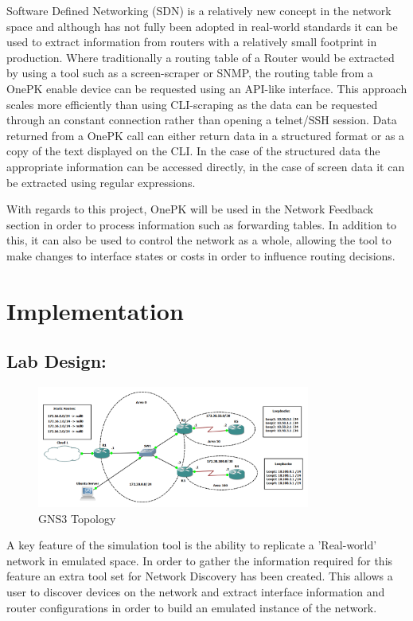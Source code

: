 \documentclass[11pt]{report}
\begin{document}
Software Defined Networking (SDN) is a relatively new concept in the network space and although has not fully been adopted in real-world standards it can be used to extract information from routers with a relatively small footprint in production. Where traditionally a routing table of a Router would be extracted by using a tool such as a screen-scraper or SNMP, the routing table from a OnePK enable device can be requested using an API-like interface. This approach scales more efficiently than using CLI-scraping as the data can be requested through an constant connection rather than opening a telnet/SSH session. Data returned from a OnePK call can either return data in a structured format or as a copy of the text displayed on the CLI. In the case of the structured data the appropriate information can be accessed directly, in the case of screen data it can be extracted using regular expressions.

With regards to this project, OnePK will be used in the Network Feedback section in order to process information such as forwarding tables. In addition to this, it can also be used to control the network as a whole, allowing the tool to make changes to interface states or costs in order to influence routing decisions.

\chapter{Implementation}

\section{Lab Design:}

\begin{figure}[h!]
\caption{GNS3 Topology}
\centering
\includegraphics[width=0.8\textwidth]{Lab-Design.png}
\end{figure}

A key feature of the simulation tool is the ability to replicate a 'Real-world' network in emulated space. In order to gather the information required for this feature an extra tool set for Network Discovery has been created. This allows a user to discover devices on the network and extract interface information and router configurations in order to build an emulated instance of the network.
\end{document}
